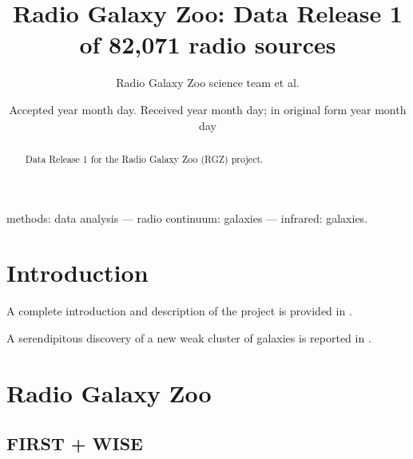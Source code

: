 \documentclass[a4,useAMS,usenatbib]{mn2e}
\title[Radio Galaxy Zoo]{Radio Galaxy Zoo: Data Release 1 of 82,071 radio sources}
\author[RGZ team]{Radio Galaxy Zoo science team et al.
}
\begin{document}
\date{Accepted year month day. Received year month day; in original form year month day}

\pagerange{\pageref{firstpage}--\pageref{lastpage}} 

\maketitle

\label{firstpage}

\begin{abstract}
Data Release 1 for the Radio Galaxy Zoo (RGZ) project.
\end{abstract}
\begin{keywords}
methods: data analysis --- radio continuum: galaxies --- infrared: galaxies. 
\end{keywords}

\section{Introduction}\label{sec:intro}

A complete introduction and description of the project is provided in \citet[][hereafter B15]{ban15}. 

A serendipitous discovery of a new weak cluster of galaxies is reported in \citet{ban16}.

\section{Radio Galaxy Zoo}\label{sec:sample}

\subsection{FIRST + WISE}\label{ssec:sample_first}
\end{document}
